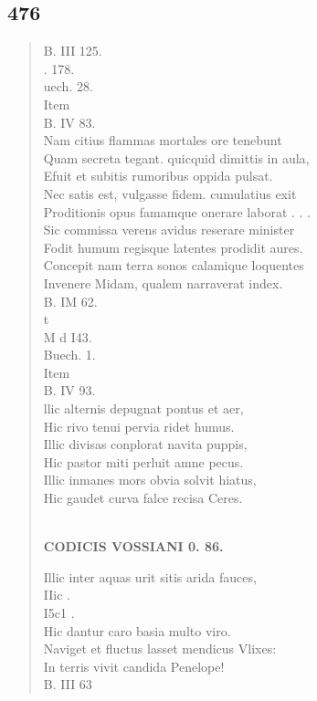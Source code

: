 \documentclass[11pt, a4paper]{report}
\begin{document}
            \subsection*{476}
      \begin{verse}
      B. III 125. \\ . 178. \\ uech. 28. \\ Item \\ B. IV 83. \\ Nam citius flammas mortales ore tenebunt \\ Quam secreta tegant. quicquid dimittis in aula, \\ Efuit et subitis rumoribus oppida pulsat. \\ Nec satis est, vulgasse fidem. cumulatius exit \\ Proditionis opus famamque onerare laborat . . . \\ Sic commissa verens avidus reserare minister \\ Fodit humum regisque latentes prodidit aures. \\ Concepit nam terra sonos calamique loquentes \\ Invenere Midam, qualem narraverat index. \\ B. IM 62. \\ t \\ M d I43. \\ Buech. 1. \\ Item \\ B. IV 93. \\ llic alternis depugnat pontus et aer, \\ Hic rivo tenui pervia ridet humus. \\ Illic divisas conplorat navita puppis, \\ Hic pastor miti perluit amne pecus. \\ Illic inmanes mors obvia solvit hiatus, \\ Hic gaudet curva falce recisa Ceres. \\ 
        ﻿\pagebreak 
    \begin{center} \textbf{CODICIS VOSSIANI 0. 86.} \end{center} \marginpar{[349]} Illic inter aquas urit sitis arida fauces, \\  \lbrack IIic \rbrack  . \\  \lbrack I5c1 . \\ Hic dantur caro basia multo viro. \\ Naviget et fluctus lasset mendicus Vlixes: \\ In terris vivit candida Penelope! \\ B. III 63 \\ 
      \end{verse}
  
\end{document}
